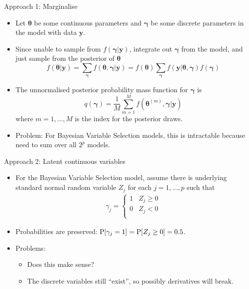 \documentclass{beamer}\usepackage[]{graphicx}\usepackage[]{color}
\renewcommand{\P}{\text{\normalfont P}}
\begin{document}
\begin{frame}{Approach 1: Marginalise}
	\vspace{-2mm}
	\begin{itemize}
		\item Let $\boldsymbol{\theta}$ be some continuous parameters and $\boldsymbol{\gamma}$ be some discrete parameters in the model with data $\mathbf y$.
		\item Since unable to sample from $f(\boldsymbol{\gamma} | \mathbf y)$, integrate out $\boldsymbol{\gamma}$ from the model, and just sample from the posterior of $\boldsymbol{\theta}$
		\[
			f(\boldsymbol{\theta} | \mathbf y) = \sum_{\boldsymbol\gamma} f(\boldsymbol{\theta}, \boldsymbol\gamma | \mathbf y)
			= f(\boldsymbol\theta) \sum_{\boldsymbol\gamma}  f(\mathbf y | \boldsymbol{\theta}, \boldsymbol\gamma)f(\boldsymbol\gamma)
		\]
		\item The unnormalised posterior probability mass function for $\boldsymbol\gamma$ is
		\[
			q(\boldsymbol{\gamma}) = \frac{1}{M} \sum_{m=1}^M f(\boldsymbol{\theta}^{(m)}, \boldsymbol\gamma | \mathbf y)
		\]
		where $m = 1, \dots, M$ is the index for the posterior draws.

		\item Problem: For Bayesian Variable Selection models, this is intractable because need to sum over all $2^p$ models.
	\end{itemize}
\end{frame}

\begin{frame}{Approach 2: Latent continuous variables}
	\begin{itemize}
		\item For the Bayesian Variable Selection model, assume there is underlying standard normal random variable $Z_j$ for each $j = 1,\dots,p$ such that
		\begin{align*}
			\gamma_j =
			\begin{cases}
				1	&Z_j \geq 0\\
				0	&Z_j < 0\\
			\end{cases}
		\end{align*}
		\item Probabilities are preserved: $\P[\gamma_j = 1] = \P[Z_j \geq 0] = 0.5$.
		\item Problems:
		\begin{itemize}
			\item Does this make sense?
			\item The discrete variables still ``exist'', so possibly derivatives will break.
		\end{itemize}
	\end{itemize}
\end{frame}
\end{document}
